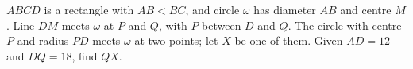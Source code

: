 $ABCD$ is a rectangle with $AB<BC$, and circle $\omega$ has diameter $AB$ and centre $M$. Line $DM$ meets $\omega$ at $P$ and $Q$, with $P$ between $D$ and $Q$. The circle with centre $P$ and radius $PD$ meets $\omega$ at two points; let $X$ be one of them. Given $AD=12$ and $DQ=18$, find $QX$.
